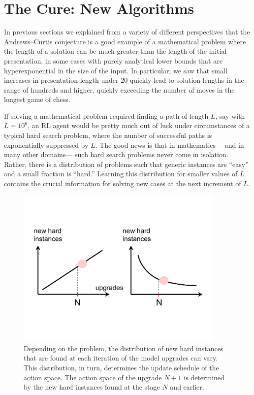 
\section{The Cure: New Algorithms}\label{sec:algo}

In previous sections we explained from a variety of different perspectives that the Andrews--Curtis conjecture is a good example of a mathematical problem where the length of a solution can be much greater than the length of the initial presentation, in some cases with purely analytical lower bounds that are hyperexponential in the size of the input. In particular, we saw that small increases in presentation length under 20 quickly lead to solution lengths in the range of hundreds and higher, quickly exceeding the number of moves in the longest game of chess.

If solving a mathematical problem required finding a path of length $L$, say with $L=10^6$, an RL agent would be pretty much out of luck under circumstances of a typical hard search problem, where the number of successful paths is exponentially suppressed by $L$. The good news is that in mathematics ---and in many other domains--- such hard search problems never come in isolation. Rather, there is a distribution of problems such that generic instances are ``easy'' and a small fraction is ``hard.'' Learning this distribution for smaller values of $L$ contains the crucial information for solving new cases at the next increment of $L$.

\begin{figure}[ht]
	\centering
	\includegraphics[trim={0.0in 2.0in 0.0in 1.5in},clip,width=4.0in]{fig/hardnesscurves.pdf}
	\caption{Depending on the problem, the distribution of new hard instances that are found at each iteration of the model upgrades can vary. This distribution, in turn, determines the update schedule of the action space. The action space of the upgrade $N+1$ is determined by the new hard instances found at the stage $N$ and earlier.}
	\label{fig:hardnesscurves}
\end{figure}


